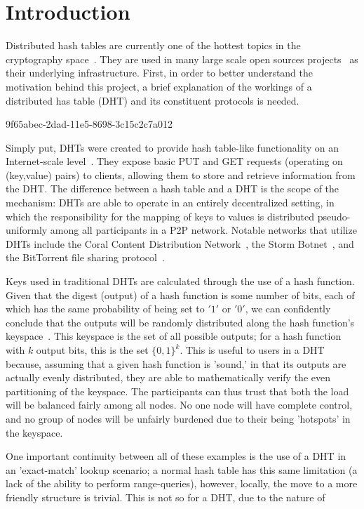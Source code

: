 \documentclass[12pt]{article}
\begin{document}
\section{Introduction}
\par Distributed hash tables are currently one of the hottest topics in the cryptography space~\cite{Stoica:2001dj,Rowstron:2001ea,Ratnasamy:2001wn}. They are used in many large scale open sources projects~\cite{Freitas:2013tb,Xu:2010vs,Perfitt:2010fh} as their underlying infrastructure. First, in order to better understand the motivation behind this project, a brief explanation of the workings of a distributed has table (DHT) and its constituent protocols is needed.

9f65abec-2dad-11e5-8698-3c15c2c7a012\par Simply put, DHTs were created to provide hash table-like functionality on an Internet-scale level~\cite{Ratnasamy:2001wn}. They expose basic PUT and GET requests (operating on (key,value) pairs) to clients, allowing them to store and retrieve information from the DHT. The difference between a hash table and a DHT is the scope of the mechanism: DHTs are able to operate in an entirely decentralized setting, in which the responsibility for the mapping of keys to values is distributed pseudo-uniformly among all participants in a P2P network. Notable networks that utilize DHTs include the Coral Content Distribution Network~\cite{Freedman:2004vb}, the Storm Botnet~\cite{Holz:2008uk}, and the BitTorrent file sharing protocol~\cite{Cohen:y1_8mBnw}.

\par Keys used in traditional DHTs are calculated through the use of a hash function. Given that the digest (output) of a hash function is some number of bits, each of which has the same probability of being set to $'1'$ or $'0'$, we can confidently conclude that the outputs will be randomly distributed along the hash function's keyspace~. This keyspace is the set of all possible outputs; for a hash function with $k$ output bits, this is the set $\{0,1\}^k$. This is useful to users in a DHT because, assuming that a given hash function is 'sound,' in that its outputs are actually evenly distributed, they are able to mathematically verify the even partitioning of the keyspace. The participants can thus trust that both the load will be balanced fairly among all nodes. No one node will have complete control, and no group of nodes will be unfairly burdened due to their being 'hotspots' in the keyspace.~

\par One important continuity between all of these examples is the use of a DHT in an 'exact-match' lookup scenario; a normal hash table has this same limitation (a lack of the ability to perform range-queries), however, locally, the move to a more friendly structure is trivial. This is not so for a DHT, due to the nature of
\printbibliography
\end{document}
